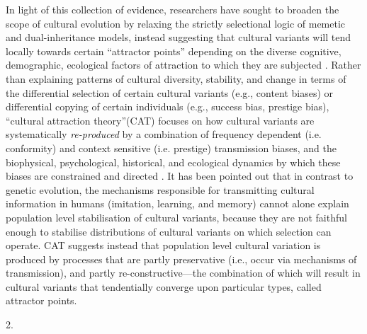 In light of this collection of evidence, researchers have sought to broaden the scope of cultural evolution by relaxing the strictly selectional logic of memetic and dual-inheritance models, instead suggesting that cultural variants will tend locally towards certain ``attractor points'' depending on the diverse cognitive, demographic, ecological factors of attraction to which they are subjected \citep{Sperber1996}.  Rather than explaining patterns of cultural diversity, stability, and change in terms of the differential selection of certain cultural variants (e.g., content biases) or differential copying of certain individuals (e.g., success bias, prestige bias),  ``cultural attraction theory''(CAT) focuses on how cultural variants are systematically \textit{re-produced} by a combination of frequency dependent (i.e. conformity) and context sensitive (i.e. prestige) transmission biases, and the biophysical, psychological, historical, and ecological dynamics by which these biases are constrained and directed \citep{Claidiere2014}.  It has been pointed out that in contrast to genetic evolution, the mechanisms responsible for transmitting cultural information in humans (imitation, learning, and memory) cannot alone explain population level stabilisation of cultural variants, because they are not faithful enough to stabilise distributions of cultural variants on which selection can operate\cite{Claidiere2014}. CAT suggests instead that population level cultural variation is produced by processes that are partly preservative (i.e., occur via mechanisms of transmission), and partly re-constructive---the combination of which will result in cultural variants that tendentially converge upon particular types, called attractor points.






2. %

















